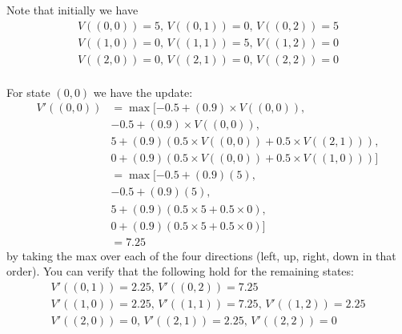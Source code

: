 \documentclass[12pt]{article}
\begin{document}
\vspace{.5pc}

\noindent {}

\vspace{.5pc}


\begin{solution}
 Note that initially we have
\begin{align*}
    V((0,0)) = 5, \, V((0,1)) = 0, \, V((0,2)) = 5 \\
    V((1,0)) = 0, \, V((1,1)) = 5, \, V((1,2)) = 0 \\
    V((2,0)) = 0, \, V((2,1)) = 0, \, V((2,2)) = 0 \\
\end{align*}

For state $(0,0)$ we have the update:
\begin{align*}
    V'((0,0)) &= \max [-0.5 + (0.9) \times V((0,0)) ,\\
            &            -0.5 + (0.9) \times V((0,0)) , \\
            &            5 + (0.9) (0.5 \times V((0,0)) + 0.5 \times V((2,1))) , \\
            &            0 + (0.9) (0.5 \times V((0,0)) + 0.5 \times V((1,0))) ] \\
            &= \max [-0.5 + (0.9)(5), \\
            &-0.5 + (0.9)(5), \\
            &5 + (0.9)(0.5 \times 5 + 0.5 \times 0), \\
            &0 + (0.9)(0.5 \times 5 + 0.5 \times 0)] \\
            &= 7.25
\end{align*}
by taking the max over each of the four directions (left, up, right, down in that order). You can verify that the following hold for the remaining states:
\begin{align*}
    V'((0,1)) = 2.25, \, V'((0,2)) = 7.25 \\
    V'((1,0)) = 2.25, \, V'((1,1)) = 7.25, \, V'((1,2)) = 2.25 \\
    V'((2,0)) = 0, \, V'((2,1)) = 2.25, \, V'((2,2)) = 0
\end{align*}
\end{solution}

\vspace{.5pc}
\end{document}
